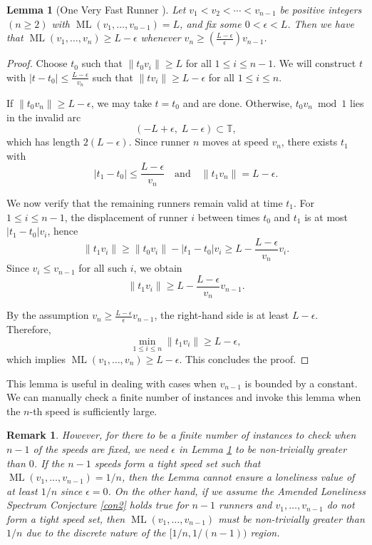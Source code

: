 \documentclass[11pt]{amsart}
\newtheorem{lemma}{Lemma}[section]
\newtheorem{remark}{Remark}[section]
\DeclareMathOperator{\ML}{ML}
\begin{document}
\begin{lemma}[One Very Fast Runner \cite{kravitz}]
\label{lem3}
    Let $v_1 < v_2 < \cdots < v_{n - 1}$ be positive integers $(n \geq 2)$ with $\ML(v_1,\ldots,v_{n - 1}) = L$, and fix some $0 < \epsilon < L$. Then we have that
    $\ML(v_1,\ldots,v_n) \geq L - \epsilon$
    whenever
    $v_n \geq \left(\frac{L - \epsilon}{\epsilon}\right)v_{n - 1}$.
\end{lemma}

\begin{proof}
Choose $t_0$ such that $\|t_0v_i\|\ge L$ for all $1\le i\le n-1$.
We will construct $t$ with $|t-t_0|\le \frac{L-\epsilon}{v_n}$ such that
$\|tv_i\|\ge L-\epsilon$ for all $1\le i\le n$.

If $\|t_0v_n\|\ge L-\epsilon$, we may take $t=t_0$ and are done.
Otherwise, $t_0v_n\bmod 1$ lies in the invalid arc
\[
(-L+\epsilon,\;L-\epsilon)\subset\mathbb T,
\]
which has length $2(L-\epsilon)$.
Since runner $n$ moves at speed $v_n$, there exists $t_1$ with
\[
|t_1-t_0|\le \frac{L-\epsilon}{v_n}
\quad\text{and}\quad
\|t_1v_n\|=L-\epsilon.
\]

We now verify that the remaining runners remain valid at time $t_1$.
For $1\le i\le n-1$, the displacement of runner $i$ between times
$t_0$ and $t_1$ is at most $|t_1-t_0|v_i$, hence
\[
\|t_1v_i\|
\ge \|t_0v_i\|-|t_1-t_0|v_i
\ge L-\frac{L-\epsilon}{v_n}v_i.
\]
Since $v_i\le v_{n-1}$ for all such $i$, we obtain
\[
\|t_1v_i\|\ge L-\frac{L-\epsilon}{v_n}v_{n-1}.
\]

By the assumption $v_n\ge \frac{L-\epsilon}{\epsilon}v_{n-1}$,
the right-hand side is at least $L-\epsilon$.
Therefore,
\[
\min_{1\le i\le n}\|t_1v_i\|\ge L-\epsilon,
\]
which implies $\ML(v_1,\ldots,v_n)\ge L-\epsilon$.
This concludes the proof.
\end{proof}


\par This lemma is useful in dealing with cases when $v_{n-1}$ is bounded by a constant. We can manually check a finite number of instances and invoke this lemma when the $n$-th speed is sufficiently large.

\begin{remark}
\label{rem1}
    However, for there to be a finite number of instances to check when $n - 1$ of the speeds are fixed, we need $\epsilon$ in Lemma \ref{lem3} to be non-trivially greater than $0$. If the $n - 1$ speeds form a tight speed set such that $\ML(v_1,\ldots,v_{n - 1}) = 1 / n$, then the Lemma cannot ensure a loneliness value of at least $1 / n$ since $\epsilon = 0$. On the other hand, if we assume the Amended Loneliness Spectrum Conjecture \ref{con2} holds true for $n - 1$ runners and $v_1,\ldots,v_{n - 1}$ do not form a tight speed set, then $\ML(v_1,\ldots,v_{n - 1})$ must be non-trivially greater than $1 / n$ due to the discrete nature of the $[1 / n,1 / (n - 1))$ region.
\end{remark}
\end{document}
